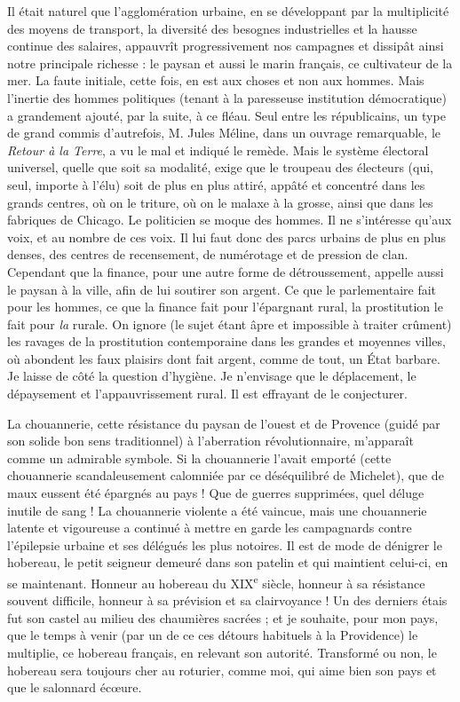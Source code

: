 \documentclass[french,twoside]{book} %
\begin{document}
Il était naturel que l’agglomération urbaine, en se développant par la multiplicité des moyens de transport, la diversité des besognes industrielles et la hausse continue des salaires, appauvrît progressivement nos campagnes et dissipât ainsi notre principale richesse : le paysan et aussi le marin français, ce cultivateur de la mer. La faute initiale, cette fois, en est aux choses et non aux hommes. Mais l’inertie des hommes politiques (tenant à la paresseuse institution démocratique) a grandement ajouté, par la suite, à ce fléau. Seul entre les républicains, un type de grand commis d’autrefois, M. Jules Méline, dans un ouvrage remarquable, le {\itshape Retour à la Terre}, a vu le mal et indiqué le remède. Mais le système électoral universel, quelle que soit sa modalité, exige que le troupeau des électeurs (qui, seul, importe à l’élu) soit de plus en plus attiré, appâté et concentré dans les grands centres, où on le triture, où on le malaxe à la grosse, ainsi que dans les fabriques de Chicago. Le politicien se moque des hommes. Il ne s’intéresse qu’aux voix, et au nombre de ces voix. Il lui faut donc des parcs urbains de plus en plus denses, des centres de recensement, de numérotage et de pression de clan. Cependant que la finance, pour une autre forme de détroussement, appelle aussi le paysan à la ville, afin de lui soutirer son argent. Ce que le parlementaire fait pour les hommes, ce que la finance fait pour l’épargnant rural, la prostitution le fait pour {\itshape la} rurale. On ignore (le sujet étant âpre et impossible à traiter crûment) les ravages de la prostitution contemporaine dans les grandes et moyennes villes, où abondent les faux plaisirs dont fait argent, comme de tout, un État barbare. Je laisse de côté la question d’hygiène. Je n’envisage que le déplacement, le dépaysement et l’appauvrissement rural. Il est effrayant de le conjecturer.\par
La chouannerie, cette résistance du paysan de l’ouest et de Provence (guidé par son solide bon sens traditionnel) à l’aberration révolutionnaire, m’apparaît comme un admirable symbole. Si la chouannerie l’avait emporté (cette chouannerie scandaleusement calomniée par ce déséquilibré de Michelet), que de maux eussent été épargnés au pays ! Que de guerres supprimées, quel déluge inutile de sang ! La chouannerie violente a été vaincue, mais une chouannerie latente et vigoureuse a continué à mettre en garde les campagnards contre l’épilepsie urbaine et ses délégués les plus notoires. Il est de mode de dénigrer le hobereau, le petit seigneur demeuré dans son patelin et qui maintient celui-ci, en se maintenant. Honneur au hobereau du XIX\textsuperscript{e} siècle, honneur à sa résistance souvent difficile, honneur à sa prévision et sa clairvoyance ! Un des derniers étais fut son castel au milieu des chaumières sacrées ; et je souhaite, pour mon pays, que le temps à venir (par un de ce ces détours habituels à la Providence) le multiplie, ce hobereau français, en relevant son autorité. Transformé ou non, le hobereau sera toujours cher au roturier, comme moi, qui aime bien son pays et que le salonnard écœure.\par
\end{document}
